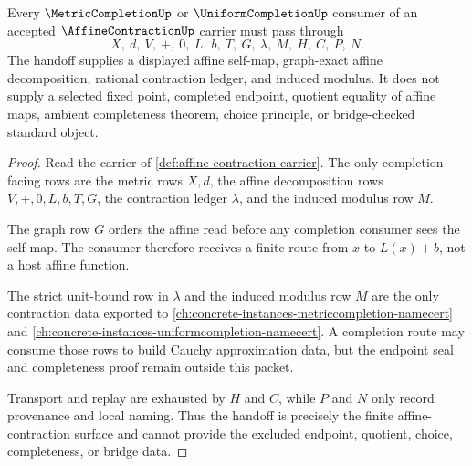 \begin{theorem}
\label{thm:affine-contraction-metric-completion-handoff}
Every $\MetricCompletionUp$ or $\UniformCompletionUp$ consumer of an accepted $\AffineContractionUp$ carrier must pass through
$$
X,\ d,\ V,\ +,\ 0,\ L,\ b,\ T,\ G,\ \lambda,\ M,\ H,\ C,\ P,\ N .
$$
The handoff supplies a displayed affine self-map, graph-exact affine decomposition, rational contraction ledger, and induced modulus. It does not supply a selected fixed point, completed endpoint, quotient equality of affine maps, ambient completeness theorem, choice principle, or bridge-checked standard object.
\end{theorem}
\begin{proof}
Read the carrier of \autoref{def:affine-contraction-carrier}. The only completion-facing rows are the metric rows $X,d$, the affine decomposition rows $V,+,0,L,b,T,G$, the contraction ledger $\lambda$, and the induced modulus row $M$.

The graph row $G$ orders the affine read before any completion consumer sees the self-map. The consumer therefore receives a finite route from $x$ to $L(x)+b$, not a host affine function.

The strict unit-bound row in $\lambda$ and the induced modulus row $M$ are the only contraction data exported to \autoref{ch:concrete-instances-metriccompletion-namecert} and \autoref{ch:concrete-instances-uniformcompletion-namecert}. A completion route may consume those rows to build Cauchy approximation data, but the endpoint seal and completeness proof remain outside this packet.

Transport and replay are exhausted by $H$ and $C$, while $P$ and $N$ only record provenance and local naming. Thus the handoff is precisely the finite affine-contraction surface and cannot provide the excluded endpoint, quotient, choice, completeness, or bridge data.
\end{proof}


